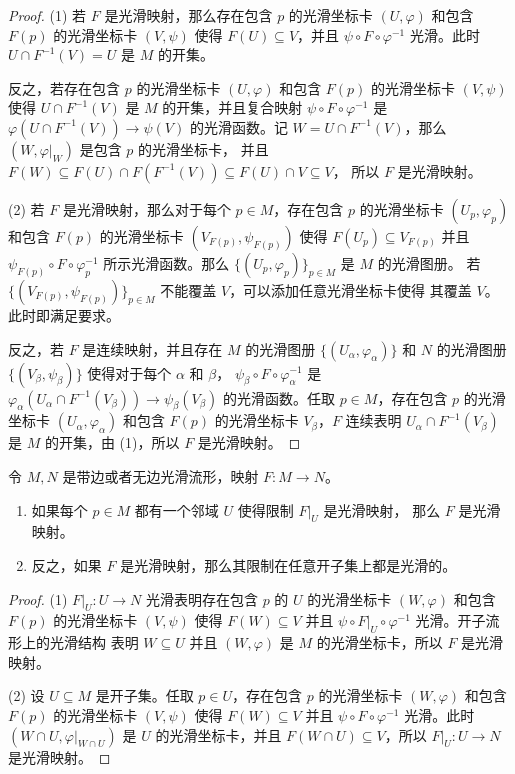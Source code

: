 \documentclass[fontset=none]{Notes}
\begin{document}
\begin{proof}
  (1) 若 $F$ 是光滑映射，那么存在包含 $p$ 的光滑坐标卡 $(U,\varphi)$
  和包含 $F(p)$ 的光滑坐标卡 $(V,\psi)$ 使得 $F(U)\subseteq V$，并且
  $\psi\circ F\circ\varphi^{-1}$ 光滑。此时 $U\cap F^{-1}(V)=U$
  是 $M$ 的开集。

  反之，若存在包含 $p$ 的光滑坐标卡 $(U,\varphi)$
  和包含 $F(p)$ 的光滑坐标卡 $(V,\psi)$ 使得 $U\cap F^{-1}(V)$
  是 $M$ 的开集，并且复合映射 $\psi\circ F\circ\varphi^{-1}$
  是 $\varphi(U\cap F^{-1}(V))\to \psi(V)$ 的光滑函数。记
  $W=U\cap F^{-1}(V)$，那么 $(W,\varphi|_W)$ 是包含 $p$ 的光滑坐标卡，
  并且 $F(W)\subseteq F(U)\cap F(F^{-1}(V))\subseteq F(U)\cap V\subseteq V$，
  所以 $F$ 是光滑映射。

  (2) 若 $F$ 是光滑映射，那么对于每个 $p\in M$，存在包含 $p$ 的光滑坐标卡
  $(U_p,\varphi_p)$ 和包含 $F(p)$ 的光滑坐标卡 $(V_{F(p)},\psi_{F(p)})$ 使得
  $F(U_p)\subseteq V_{F(p)}$ 并且 $\psi_{F(p)}\circ F\circ\varphi_p^{-1}$
  所示光滑函数。那么 $\{(U_p,\varphi_p)\}_{p\in M}$ 是 $M$ 的光滑图册。
  若 $\{(V_{F(p)},\psi_{F(p)})\}_{p\in M}$ 不能覆盖 $V$，可以添加任意光滑坐标卡使得
  其覆盖 $V$。此时即满足要求。

  反之，若 $F$ 是连续映射，并且存在 $M$ 的光滑图册 $\{(U_\alpha,\varphi_\alpha)\}$
  和 $N$ 的光滑图册 $\{(V_\beta,\psi_\beta)\}$ 使得对于每个 $\alpha$ 和 $\beta$，
  $\psi_\beta\circ F\circ\varphi_\alpha^{-1}$ 是
  $\varphi_\alpha(U_\alpha\cap F^{-1}(V_\beta))\to\psi_\beta(V_\beta)$
  的光滑函数。任取 $p\in M$，存在包含 $p$ 的光滑坐标卡 $(U_\alpha,\varphi_\alpha)$
  和包含 $F(p)$ 的光滑坐标卡 $V_\beta$，$F$ 连续表明 $U_\alpha\cap F^{-1}(V_\beta)$
  是 $M$ 的开集，由 (1)，所以 $F$ 是光滑映射。
\end{proof}

\begin{proposition}[光滑性是局部的]\label{prop:smoothness is local}
  令 $M,N$ 是带边或者无边光滑流形，映射 $F:M\to N$。
  \begin{enumerate}
    \item 如果每个 $p\in M$ 都有一个邻域 $U$ 使得限制 $F|_U$ 是光滑映射，
    那么 $F$ 是光滑映射。
    \item 反之，如果 $F$ 是光滑映射，那么其限制在任意开子集上都是光滑的。
  \end{enumerate}
\end{proposition}
\begin{proof}
  (1) $F|_U:U\to N$ 光滑表明存在包含 $p$ 的 $U$ 的光滑坐标卡
  $(W,\varphi)$ 和包含 $F(p)$ 的光滑坐标卡 $(V,\psi)$ 使得 $F(W)\subseteq V$ 并且
  $\psi\circ F|_U\circ\varphi^{-1}$ 光滑。开子流形上的光滑结构
  表明 $W\subseteq U$ 并且 $(W,\varphi)$ 是 $M$ 的光滑坐标卡，所以 $F$
  是光滑映射。

  (2) 设 $U\subseteq M$ 是开子集。任取 $p\in U$，存在包含 $p$ 的光滑坐标卡
  $(W,\varphi)$ 和包含 $F(p)$ 的光滑坐标卡 $(V,\psi)$ 使得 $F(W)\subseteq V$
  并且 $\psi\circ F\circ \varphi^{-1}$ 光滑。此时 $(W\cap U,\varphi|_{W\cap U})$
  是 $U$ 的光滑坐标卡，并且 $F(W\cap U)\subseteq V$，所以 $F|_U:U\to N$ 是光滑映射。
\end{proof}
\end{document}
